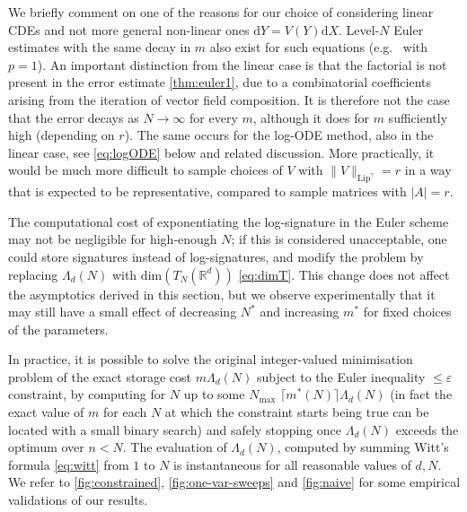 \documentclass{article}
\def\d{\mathrm{d}}
\def\eps{\varepsilon}
\numberwithin{equation}{section}
\theoremstyle{definition}
\theoremstyle{remark}
\begin{document}
\begin{remark}\label{rem:allCDEs}
	We briefly comment on one of the reasons for our choice of considering linear CDEs and not more general non-linear ones $\d Y = V(Y)\d X$. Level-$N$ Euler estimates with the same decay in $m$ also exist for such equations (e.g.\ \cite[Theorem 10.30]{FV10} with $p = 1$). An important distinction from the linear case is that the factorial is not present in the error estimate \autoref{thm:euler1}, due to a combinatorial coefficients arising from the iteration of vector field composition. It is therefore not the case that the error decays as $N \to \infty$ for every $m$, although it does for $m$ sufficiently high (depending on $r$). The same occurs for the log-ODE method, also in the linear case, see \eqref{eq:logODE} below and related discussion. More practically, it would be much more difficult to sample choices of $V$ with $\|V\|_{\mathrm{Lip}^\gamma} = r$ in a way that is expected to be representative, compared to sample matrices with $|A| = r$.
\end{remark}

\begin{remark}
	The computational cost of exponentiating the log-signature in the Euler scheme may not be negligible for high-enough $N$; if this is considered unacceptable, one could store signatures instead of log-signatures, and modify the problem by replacing $\Lambda_d(N)$ with $\mathrm{dim}(T_N(\mathbb R^d))$ \eqref{eq:dimT}. This change does not affect the asymptotics derived in this section, but we observe experimentally \cite{code} that it may still have a small effect of decreasing $N^*$ and increasing $m^*$ for fixed choices of the parameters.
\end{remark}

In practice, it is possible to solve the original integer-valued minimisation problem of the exact storage cost $m\Lambda_d(N)$ subject to the Euler inequality $\leq \eps$ constraint, by computing for $N$ up to some $N_\mathrm{max}$ $\lceil m^*(N) \rceil\Lambda_d(N)$ (in fact the exact value of $m$ for each $N$ at which the constraint starts being true can be located with a small binary search) and safely stopping once $\Lambda_d(N)$ exceeds the optimum over $n < N$. The evaluation of $\Lambda_d(N)$, computed by summing Witt's formula \eqref{eq:witt} from $1$ to $N$ is instantaneous for all reasonable values of $d, N$. We refer to \autoref{fig:constrained}, \autoref{fig:one-var-sweeps} and \autoref{fig:naive} for some empirical validations of our results.
\end{document}
